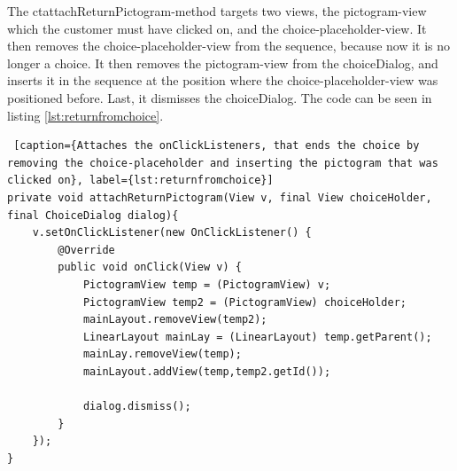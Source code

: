 The ct{attachReturnPictogram}-method targets two views, the pictogram-view which the customer must have clicked on, and the choice-placeholder-view. It then removes the choice-placeholder-view from the sequence, because now it is no longer a choice. It then removes the pictogram-view from the choiceDialog, and inserts it in the sequence at the position where the choice-placeholder-view was positioned before. Last, it dismisses the choiceDialog.  The code can be seen in listing \ref{lst:returnfromchoice}.

\begin{lstlisting} [caption={Attaches the onClickListeners, that ends the choice by removing the choice-placeholder and inserting the pictogram that was clicked on}, label={lst:returnfromchoice}]
private void attachReturnPictogram(View v, final View choiceHolder, final ChoiceDialog dialog){
	v.setOnClickListener(new OnClickListener() {
		@Override
		public void onClick(View v) {
			PictogramView temp = (PictogramView) v;
			PictogramView temp2 = (PictogramView) choiceHolder;
			mainLayout.removeView(temp2);
			LinearLayout mainLay = (LinearLayout) temp.getParent();
			mainLay.removeView(temp);
			mainLayout.addView(temp,temp2.getId());

			dialog.dismiss();
		}
	});
}
\end{lstlisting}




